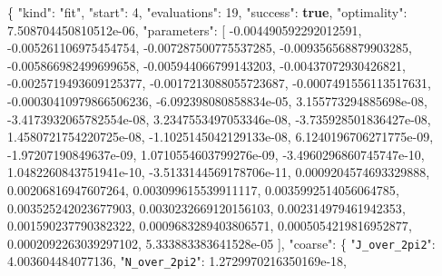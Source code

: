 \documentclass[
  10pt,
]{article}
\newenvironment{Shaded}{}{}
\newcommand{\DataTypeTok}[1]{\textcolor[rgb]{0.56,0.13,0.00}{#1}}
\newcommand{\DecValTok}[1]{\textcolor[rgb]{0.25,0.63,0.44}{#1}}
\newcommand{\FloatTok}[1]{\textcolor[rgb]{0.25,0.63,0.44}{#1}}
\newcommand{\FunctionTok}[1]{\textcolor[rgb]{0.02,0.16,0.49}{#1}}
\newcommand{\KeywordTok}[1]{\textcolor[rgb]{0.00,0.44,0.13}{\textbf{#1}}}
\newcommand{\OtherTok}[1]{\textcolor[rgb]{0.00,0.44,0.13}{#1}}
\newcommand{\StringTok}[1]{\textcolor[rgb]{0.25,0.44,0.63}{#1}}
\begin{document}
\begin{Shaded}
\begin{Highlighting}[]
\FunctionTok{\{}
  \DataTypeTok{"kind"}\FunctionTok{:} \StringTok{"fit"}\FunctionTok{,}
  \DataTypeTok{"start"}\FunctionTok{:} \DecValTok{4}\FunctionTok{,}
  \DataTypeTok{"evaluations"}\FunctionTok{:} \DecValTok{19}\FunctionTok{,}
  \DataTypeTok{"success"}\FunctionTok{:} \KeywordTok{true}\FunctionTok{,}
  \DataTypeTok{"optimality"}\FunctionTok{:} \FloatTok{7.508704450810512e{-}06}\FunctionTok{,}
  \DataTypeTok{"parameters"}\FunctionTok{:} \OtherTok{[}
    \FloatTok{{-}0.004490592292012591}\OtherTok{,}
    \FloatTok{{-}0.005261106975454754}\OtherTok{,}
    \FloatTok{{-}0.007287500775537285}\OtherTok{,}
    \FloatTok{{-}0.009356568879903285}\OtherTok{,}
    \FloatTok{{-}0.005866982499699658}\OtherTok{,}
    \FloatTok{{-}0.005944066799143203}\OtherTok{,}
    \FloatTok{{-}0.00437072930426821}\OtherTok{,}
    \FloatTok{{-}0.0025719493609125377}\OtherTok{,}
    \FloatTok{{-}0.0017213088055723687}\OtherTok{,}
    \FloatTok{{-}0.0007491556113517631}\OtherTok{,}
    \FloatTok{{-}0.00030410979866506236}\OtherTok{,}
    \FloatTok{{-}6.092398080858834e{-}05}\OtherTok{,}
    \FloatTok{3.155773294885698e{-}08}\OtherTok{,}
    \FloatTok{{-}3.4173932065782554e{-}08}\OtherTok{,}
    \FloatTok{3.2347553497053346e{-}08}\OtherTok{,}
    \FloatTok{{-}3.735928501836427e{-}08}\OtherTok{,}
    \FloatTok{1.4580721754220725e{-}08}\OtherTok{,}
    \FloatTok{{-}1.1025145042129133e{-}08}\OtherTok{,}
    \FloatTok{6.1240196706271775e{-}09}\OtherTok{,}
    \FloatTok{{-}1.97207190849637e{-}09}\OtherTok{,}
    \FloatTok{1.0710554603799276e{-}09}\OtherTok{,}
    \FloatTok{{-}3.4960296860745747e{-}10}\OtherTok{,}
    \FloatTok{1.0482260843751941e{-}10}\OtherTok{,}
    \FloatTok{{-}3.5133144569178706e{-}11}\OtherTok{,}
    \FloatTok{0.0009204574693329888}\OtherTok{,}
    \FloatTok{0.00206816947607264}\OtherTok{,}
    \FloatTok{0.003099615539911117}\OtherTok{,}
    \FloatTok{0.0035992514056064785}\OtherTok{,}
    \FloatTok{0.003525242023677903}\OtherTok{,}
    \FloatTok{0.0030232669120156103}\OtherTok{,}
    \FloatTok{0.002314979461942353}\OtherTok{,}
    \FloatTok{0.001590237790382322}\OtherTok{,}
    \FloatTok{0.0009683289403806571}\OtherTok{,}
    \FloatTok{0.0005054219816952877}\OtherTok{,}
    \FloatTok{0.0002092263039297102}\OtherTok{,}
    \FloatTok{5.333883383641528e{-}05}
  \OtherTok{]}\FunctionTok{,}
  \DataTypeTok{"coarse"}\FunctionTok{:} \FunctionTok{\{}
    \DataTypeTok{"\nolinkurl{J_over_2pi2}"}\FunctionTok{:} \FloatTok{4.003604484077136}\FunctionTok{,}
    \DataTypeTok{"\nolinkurl{N_over_2pi2}"}\FunctionTok{:} \FloatTok{1.2729970216350169e{-}18}\FunctionTok{,}

\end{Highlighting}
\end{Shaded}
\end{document}
